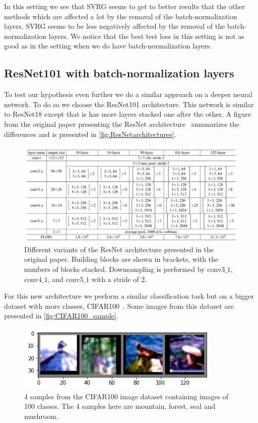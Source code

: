 \documentclass[a4paper,11pt,oneside]{report}
\begin{document}
In this setting we see that SVRG seems to get to better results that the other methods which are affected a lot by the removal of the batch-normalization layers. SVRG seems to be less negatively affected by the removal of the batch-normalization layers. We notice that the best test loss in this setting is not as good as in the setting when we do have batch-normalization layers.

\subsection{ResNet101 with batch-normalization layers}

To test our hypothesis even further we do a similar approach on a deeper neural network. To do so we choose the ResNet101 architecture. This network is similar to ResNet18 except that is has more layers stacked one after the other. A figure from the original paper presenting the ResNet architecture~\cite{he2015deep} summarizes the differences and is presented in \autoref{fig:ResNetarchitectures}.

\begin{figure}
    \centering
    \includegraphics{figures/ResNetArchitectures.png}
    \caption{Different variants of the ResNet architecture presented in the original paper. Building blocks are shown in brackets, with the numbers of blocks stacked. Downsampling is performed by conv$3\_1$, conv$4\_1$, and conv$5\_1$ with a stride of 2.}
    \label{fig:ResNetarchitectures}
\end{figure}

For this new architecture we perform a similar classification task but on a bigger dataset with more classes, CIFAR100~\cite{Krizhevsky09learningmultiple}. Some images from this dataset are presented in \autoref{fig:CIFAR100_sample}.

\begin{figure}
    \centering
    \includegraphics{figures/CIFAR100_sample.png}
    \caption{4 samples from the CIFAR100 image dataset containing images of 100 classes. The 4 samples here are mountain, forest, seal and mushroom.}
    \label{fig:CIFAR100_sample}
\end{figure}
\end{document}
